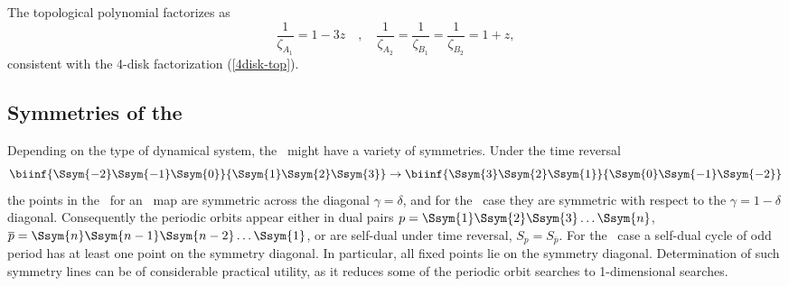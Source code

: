 The topological polynomial factorizes as
\[
\frac{1}{\zeta_{A_1}} = 1-3z \quad,\quad
\frac{1}{\zeta_{A_2}} =
\frac{1}{\zeta_{B_1}} =
\frac{1}{\zeta_{B_2}} = 1 + z,
\]\noindent
consistent with the 4-disk factorization (\ref{4disk-top}).

\subsection{Symmetries of the \topp}
\label{c-symbol-plane}

Depending on the type of dynamical system, the \topp\ might have
a variety of symmetries.
Under the time reversal
\[
   \biinf{\Ssym{-2}\Ssym{-1}\Ssym{0}}{\Ssym{1}\Ssym{2} \Ssym{3}}
\to
   \biinf{\Ssym{3}\Ssym{2}\Ssym{1}}{\Ssym{0}\Ssym{-1} \Ssym{-2}}
\]
the points in the  \topp\ for an \opres\ map are
symmetric across the diagonal $\gamma=\delta$, and
for the \orev\ case they are symmetric
with respect to the $\gamma=1-\delta$ diagonal.
Consequently the  periodic orbits appear either in dual pairs
$p=\Ssym{1} \Ssym{2} \Ssym{3} \ldots \Ssym{n}$,
$\overline{p}=\Ssym{n} \Ssym{n-1} \Ssym{n-2} \ldots \Ssym{1}$,
or are self-dual under time reversal,
$S_{p} = S_{\overline{p}}$.
For the \opres\ case
a self-dual cycle of odd period has at least one point on the
symmetry diagonal. In particular, all fixed points lie on the symmetry
diagonal. Determination of such symmetry lines can be of considerable
practical utility, as it reduces some of the periodic orbit
searches to 1-dimensional searches.

